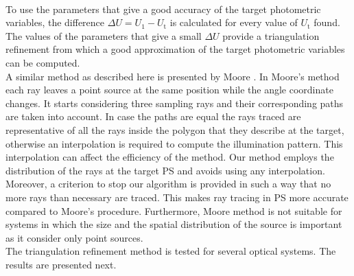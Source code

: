 \\ \indent To use the parameters that give a good accuracy of the target photometric variables, the difference $\Delta U = U_1-U_{\textrm{t}}$ is calculated for every value of $U_{\textrm{t}}$ found. The values of the parameters that give a small $\Delta U$ provide a triangulation refinement from which a good approximation of the target photometric variables can be computed.
\\ \indent A similar method as described here is presented by Moore \cite{moore2013methods}. In Moore's method each ray leaves a point source at the same position while the angle coordinate changes. It starts considering three sampling rays and their corresponding paths are taken into account. In case the paths are equal the rays traced are representative of all the rays inside the polygon that they describe at the target, otherwise an interpolation is required to compute the illumination pattern. This interpolation can affect the efficiency of the method. Our method employs the distribution of the rays at the target PS and avoids using any interpolation. Moreover, a criterion to stop our algorithm is provided in such a way that no more rays than necessary are traced. This makes ray tracing in PS more accurate compared to Moore's procedure. Furthermore, Moore method is not suitable for systems in which the size and the spatial distribution of the source is important as it consider only point sources.\\ \indent
The triangulation refinement method is tested for several optical systems. The results are presented next.

